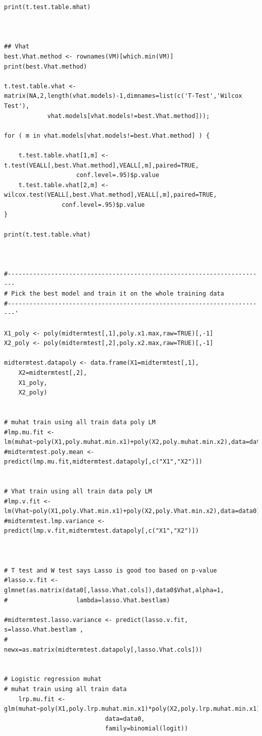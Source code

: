 \documentclass[twoside,12pt]{article}
\begin{document}
\begin{verbatim}
print(t.test.table.mhat)



## Vhat
best.Vhat.method <- rownames(VM)[which.min(VM)]
print(best.Vhat.method)

t.test.table.vhat <- matrix(NA,2,length(vhat.models)-1,dimnames=list(c('T-Test','Wilcox Test'), 
			vhat.models[vhat.models!=best.Vhat.method]));

for ( m in vhat.models[vhat.models!=best.Vhat.method] ) {

	t.test.table.vhat[1,m] <- t.test(VEALL[,best.Vhat.method],VEALL[,m],paired=TRUE,
					conf.level=.95)$p.value
	t.test.table.vhat[2,m] <- wilcox.test(VEALL[,best.Vhat.method],VEALL[,m],paired=TRUE,
				conf.level=.95)$p.value	
}

print(t.test.table.vhat)



#------------------------------------------------------------------------
# Pick the best model and train it on the whole training data
#------------------------------------------------------------------------'

X1_poly <- poly(midtermtest[,1],poly.x1.max,raw=TRUE)[,-1]
X2_poly <- poly(midtermtest[,2],poly.x2.max,raw=TRUE)[,-1]

midtermtest.datapoly <- data.frame(X1=midtermtest[,1],
	X2=midtermtest[,2],
	X1_poly,
	X2_poly)


# muhat train using all train data poly LM
#lmp.mu.fit <- lm(muhat~poly(X1,poly.muhat.min.x1)+poly(X2,poly.muhat.min.x2),data=data0)
#midtermtest.poly.mean <- predict(lmp.mu.fit,midtermtest.datapoly[,c("X1","X2")])


# Vhat train using all train data poly LM
#lmp.v.fit <- lm(Vhat~poly(X1,poly.Vhat.min.x1)+poly(X2,poly.Vhat.min.x2),data=data0)
#midtermtest.lmp.variance <- predict(lmp.v.fit,midtermtest.datapoly[,c("X1","X2")])



# T test and W test says Lasso is good too based on p-value
#lasso.v.fit <- glmnet(as.matrix(data0[,lasso.Vhat.cols]),data0$Vhat,alpha=1, 
#					lambda=lasso.Vhat.bestlam)

#midtermtest.lasso.variance <- predict(lasso.v.fit, s=lasso.Vhat.bestlam , 
#					newx=as.matrix(midtermtest.datapoly[,lasso.Vhat.cols]))


# Logistic regression muhat
# muhat train using all train data
	lrp.mu.fit <- glm(muhat~poly(X1,poly.lrp.muhat.min.x1)*poly(X2,poly.lrp.muhat.min.x1),
							data=data0,
							family=binomial(logit))


\end{verbatim}
\end{document}
